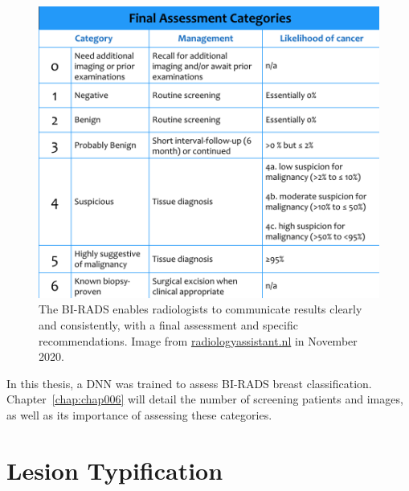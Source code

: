 
\begin{figure}[htbp]
\centering
\includegraphics[width=\columnwidth]{images/fig020}
\caption{The BI-RADS enables radiologists to communicate results clearly and consistently, with a final assessment and specific recommendations. Image from \protect\href{https://radiologyassistant.nl/breast/bi-rads/bi-rads-for-mammography-and-ultrasound-2013}{radiologyassistant.nl} in November 2020.}
\label{fig:fig020}
\end{figure}

In this thesis, a \ac{DNN} was trained to assess \ac{BI-RADS} breast classification.
Chapter~\ref{chap:chap006} will detail the number of screening patients and images, as well as its importance of assessing these categories.

\section{Lesion Typification}
\label{sec:sec002004}

